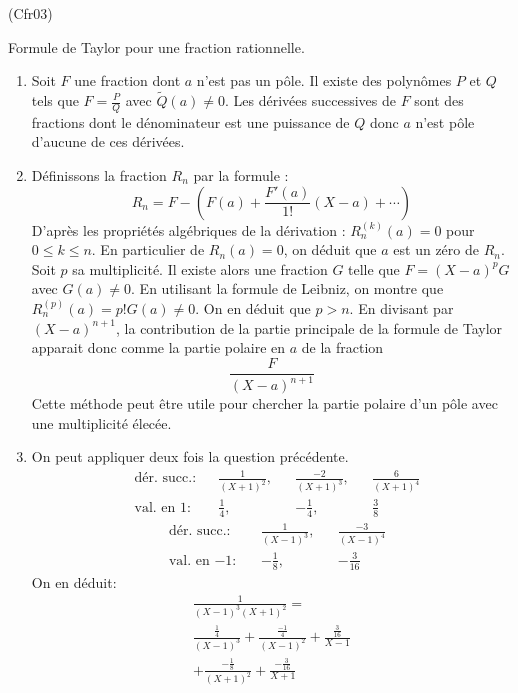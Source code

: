 \begin{tiny}(Cfr03)\end{tiny} Formule de Taylor pour une fraction rationnelle.
\begin{enumerate}
 \item Soit $F$ une fraction dont $a$ n'est pas un pôle. Il existe des polynômes $P$ et $Q$ tels que $F=\frac{P}{Q}$ avec $\widetilde{Q}(a)\neq0$. Les dérivées successives de $F$ sont des fractions dont le dénominateur est une puissance de $Q$ donc $a$ n'est pôle d'aucune de ces dérivées. 
 \item Définissons la fraction $R_n$ par la formule :
\begin{displaymath}
 R_n = F-\left( F(a)+\frac{F'(a)}{1!}(X-a) + \cdots\right) 
\end{displaymath}
D'après les propriétés algébriques de la dérivation : 
$R_n^{(k)}(a)=0$ pour $0\leq k \leq n$. En particulier de $R_n(a)=0$, on déduit que $a$ est un zéro de $R_n$. Soit $p$ sa multiplicité. Il existe alors une fraction $G$ telle que $F=(X-a)^pG$ avec $G(a)\neq0$. En utilisant la formule de Leibniz, on montre que $R_n^{(p)}(a)=p!G(a)\neq0$. On en déduit que $p>n$.\newline
En divisant par $(X-a)^{n+1}$, la contribution de la partie principale de la formule de Taylor apparait donc comme la partie polaire en $a$ de la fraction
\begin{displaymath}
 \frac{F}{(X-a)^{n+1}}
\end{displaymath}
Cette méthode peut être utile pour chercher la partie polaire d'un pôle avec une multiplicité élecée.
\item On peut appliquer deux fois la question précédente.
\begin{align*}
 &\text{dér. succ.}:& &\frac{1}{(X+1)^2},& &\frac{-2}{(X+1)^{3}},& &\frac{6}{(X+1)^{4}}\\
 &\text{val. en 1}:& &\frac{1}{4},& &-\frac{1}{4},& &\frac{3}{8}
\end{align*}
\begin{align*}
 &\text{dér. succ.}:& &\frac{1}{(X-1)^3},& &\frac{-3}{(X-1)^{4}}\\
 &\text{val. en $-1$}:& &-\frac{1}{8},& &-\frac{3}{16}
\end{align*}
On en déduit:
\begin{multline*}
 \frac{1}{(X-1)^3(X+1)^2}=\\
\frac{\frac{1}{4}}{(X-1)^3}+\frac{\frac{-1}{4}}{(X-1)^2}+\frac{\frac{3}{16}}{X-1}\\
+\frac{-\frac{1}{8}}{(X+1)^2}+\frac{-\frac{3}{16}}{X+1}
\end{multline*}

\end{enumerate}
 